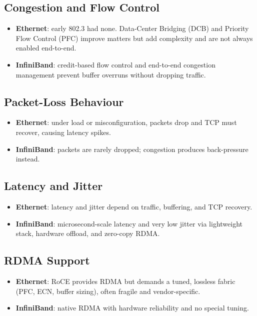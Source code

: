 \subsection{Congestion and Flow Control}
\begin{itemize}
  \item \textbf{Ethernet}: early 802.3 had none.  Data-Center Bridging
        (DCB) and Priority Flow Control (PFC) improve matters but add
        complexity and are not always enabled end-to-end.
  \item \textbf{InfiniBand}: credit-based flow control and end-to-end
        congestion management prevent buffer overruns without dropping
        traffic.
\end{itemize}

\subsection{Packet-Loss Behaviour}
\begin{itemize}
  \item \textbf{Ethernet}: under load or misconfiguration, packets drop
        and TCP must recover, causing latency spikes.
  \item \textbf{InfiniBand}: packets are rarely dropped; congestion
        produces back-pressure instead.
\end{itemize}

\subsection{Latency and Jitter}
\begin{itemize}
  \item \textbf{Ethernet}: latency and jitter depend on traffic,
        buffering, and TCP recovery.
  \item \textbf{InfiniBand}: microsecond-scale latency and very low
        jitter via lightweight stack, hardware offload, and zero-copy
        RDMA.
\end{itemize}

\subsection{RDMA Support}
\begin{itemize}
  \item \textbf{Ethernet}: RoCE provides RDMA but demands a tuned,
        lossless fabric (PFC, ECN, buffer sizing), often fragile and
        vendor-specific.
  \item \textbf{InfiniBand}: native RDMA with hardware reliability and
        no special tuning.
\end{itemize}

